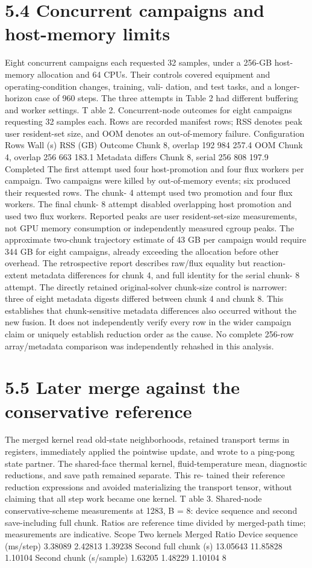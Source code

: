 \documentclass[11pt]{article}
\begin{document}
\section*{5.4 Concurrent campaigns and host-memory limits}

Eight concurrent campaigns each requested 32 samples, under a 256-GB host-memory allocation
and 64 CPUs. Their controls covered equipment and operating-condition changes, training, vali-
dation, and test tasks, and a longer-horizon case of 960 steps. The three attempts in Table 2 had
different buffering and worker settings.
T able 2. Concurrent-node outcomes for eight campaigns requesting 32 samples each. Rows are
recorded manifest rows; RSS denotes peak user resident-set size, and OOM denotes an
out-of-memory failure.
Configuration Rows Wall (s) RSS (GB) Outcome
Chunk 8, overlap 192 984 257.4 OOM
Chunk 4, overlap 256 663 183.1 Metadata differs
Chunk 8, serial 256 808 197.9 Completed
The first attempt used four host-promotion and four flux workers per campaign. Two campaigns
were killed by out-of-memory events; six produced their requested rows. The chunk- 4 attempt
used two promotion and four flux workers. The final chunk- 8 attempt disabled overlapping host
promotion and used two flux workers. Reported peaks are user resident-set-size measurements, not
GPU memory consumption or independently measured cgroup peaks. The approximate two-chunk
trajectory estimate of 43 GB per campaign would require 344 GB for eight campaigns, already
exceeding the allocation before other overhead.
The retrospective report describes raw/flux equality but reaction-extent metadata differences
for chunk 4, and full identity for the serial chunk- 8 attempt. The directly retained original-solver
chunk-size control is narrower: three of eight metadata digests differed between chunk 4 and chunk
8. This establishes that chunk-sensitive metadata differences also occurred without the new fusion.
It does not independently verify every row in the wider campaign claim or uniquely establish
reduction order as the cause. No complete 256-row array/metadata comparison was independently
rehashed in this analysis.

\section*{5.5 Later merge against the conservative reference}

The merged kernel read old-state neighborhoods, retained transport terms in registers, immediately
applied the pointwise update, and wrote to a ping-pong state partner. The shared-face thermal
kernel, fluid-temperature mean, diagnostic reductions, and save path remained separate. This re-
tained their reference reduction expressions and avoided materializing the transport tensor, without
claiming that all step work became one kernel.
T able 3. Shared-node conservative-scheme measurements at 1283, B = 8: device sequence and
second save-including full chunk. Ratios are reference time divided by merged-path time;
measurements are indicative.
Scope Two kernels Merged Ratio
Device sequence (ms/step) 3.38089 2.42813 1.39238
Second full chunk (s) 13.05643 11.85828 1.10104
Second chunk (s/sample) 1.63205 1.48229 1.10104
8
\end{document}
